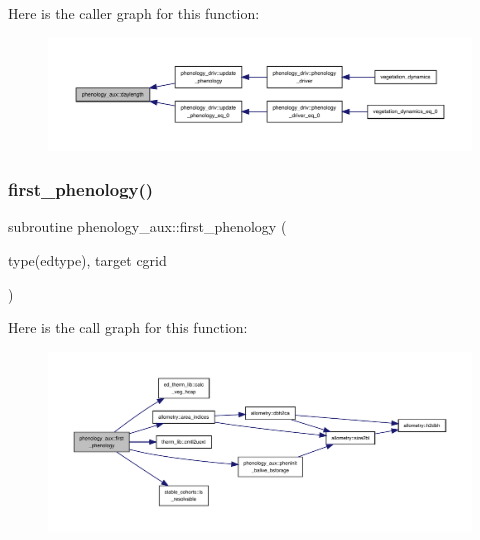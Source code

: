 Here is the caller graph for this function\+:
\nopagebreak
\begin{figure}[H]
\begin{center}
\leavevmode
\includegraphics[width=350pt]{namespacephenology__aux_a6fd36340ae7c75f11750adbf09d700d9_icgraph}
\end{center}
\end{figure}
\mbox{\label{namespacephenology__aux_ac9c11ddf83cd16439262bc9c7c72bf2e}} 
\subsubsection{\texorpdfstring{first\+\_\+phenology()}{first\_phenology()}}
{\footnotesize\ttfamily subroutine phenology\+\_\+aux\+::first\+\_\+phenology (\begin{DoxyParamCaption}\item[{type(edtype), target}]{cgrid }\end{DoxyParamCaption})}

Here is the call graph for this function\+:
\nopagebreak
\begin{figure}[H]
\begin{center}
\leavevmode
\includegraphics[width=350pt]{namespacephenology__aux_ac9c11ddf83cd16439262bc9c7c72bf2e_cgraph}
\end{center}
\end{figure}
\mbox{\label{namespacephenology__aux_ac99e8cfcfd964b2feceda6835f18a4e2}} 
